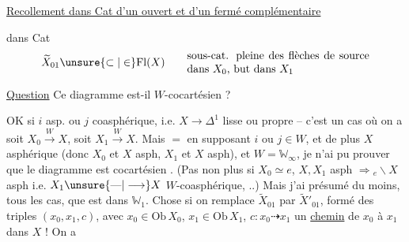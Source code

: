 
\uline{Recollement dans Cat d’un ouvert et d’un fermé complémentaire}

dans Cat
\[
\widetilde X_{01}\unsure{\subset|\in}\mathrm{Fl}(X)\qquad
\text{\parbox{.48\linewidth}{sous-cat. pleine des flèches de source dans $X_0$, but dans $X_1$}}
\]

\uline{Question} Ce diagramme est-il $W$-cocartésien ?

OK si $i$ asp. ou $j$ coasphérique, i.e. $X\longrightarrow\Delta^1$ lisse ou propre -- c’est un cas où on a soit $X_0\xrightarrow{W}X$, soit $X_1\xrightarrow{W}X$. Mais $=$ en supposant $i$ ou $j\in W$, et de plus $X$ asphérique (donc $X_0$ et $X$ asph, $X_1$ et $X$ asph), et $W=\mathbb W_\infty$, je n’ai pu prouver que le diagramme est cocartésien .
(Pas non plus si $X_0\simeq e$, $X,X_1$ asph $\Longrightarrow {}_e\backslash X$ asph i.e. $X_1\unsure{\text{---}|\longrightarrow}X$ $W$-coasphérique, ..) Mais j’ai présumé du moins,  tous les cas, que
 est dans $\mathbb W_1$. \unsure{$\Big]$} Chose   si on remplace $\widetilde X_{01}$ par $\widetilde X'_{01}$, formé des triples $(x_0,x_1,c)$, avec $x_0\in\mathrm{Ob}\,X_0$, $x_1\in\mathrm{Ob}\,X_1$, $c:x_0\dashrightarrow x_1$ un \uline{chemin} de $x_0$ à $x_1$ dans $X$ ! \unsure{$\Big\}$} On a

